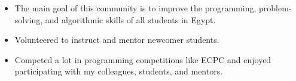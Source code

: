 





\begin{itemize}
    \item The main goal of this community is to improve the programming, problem-solving, and algorithmic skills of all students in Egypt.
    \item Volunteered to instruct and mentor newcomer students.
    \item Competed a lot in programming competitions like ECPC and enjoyed participating with my colleagues, students, and mentors.
\end{itemize}




